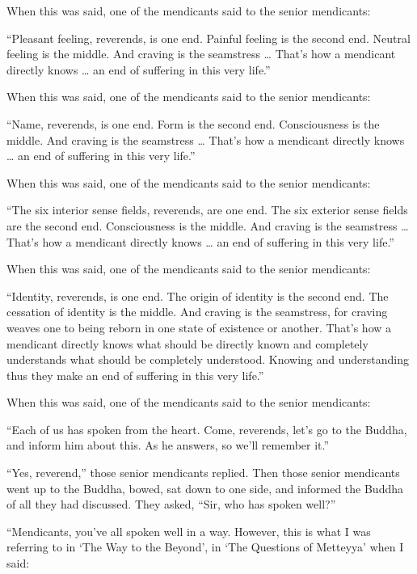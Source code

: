 \documentclass[12pt,openany]{book}%
\begin{document}
When this was said, one of the mendicants said to the senior mendicants: 

“Pleasant feeling, reverends, is one end. Painful feeling is the second end. Neutral feeling is the middle. And craving is the seamstress … That’s how a mendicant directly knows … an end of suffering in this very life.” 

When this was said, one of the mendicants said to the senior mendicants: 

“Name, reverends, is one end. Form is the second end. Consciousness is the middle. And craving is the seamstress … That’s how a mendicant directly knows … an end of suffering in this very life.” 

When this was said, one of the mendicants said to the senior mendicants: 

“The six interior sense fields, reverends, are one end. The six exterior sense fields are the second end. Consciousness is the middle. And craving is the seamstress … That’s how a mendicant directly knows … an end of suffering in this very life.” 

When this was said, one of the mendicants said to the senior mendicants: 

“Identity, reverends, is one end. The origin of identity is the second end. The cessation of identity is the middle. And craving is the seamstress, for craving weaves one to being reborn in one state of existence or another. That’s how a mendicant directly knows what should be directly known and completely understands what should be completely understood. Knowing and understanding thus they make an end of suffering in this very life.” 

When this was said, one of the mendicants said to the senior mendicants: 

“Each of us has spoken from the heart. Come, reverends, let’s go to the Buddha, and inform him about this. As he answers, so we’ll remember it.” 

“Yes, reverend,” those senior mendicants replied. Then those senior mendicants went up to the Buddha, bowed, sat down to one side, and informed the Buddha of all they had discussed. They asked, “Sir, who has spoken well?” 

“Mendicants, you’ve all spoken well in a way. However, this is what I was referring to in ‘The Way to the Beyond’, in ‘The Questions of Metteyya’ when I said: 
\end{document}
